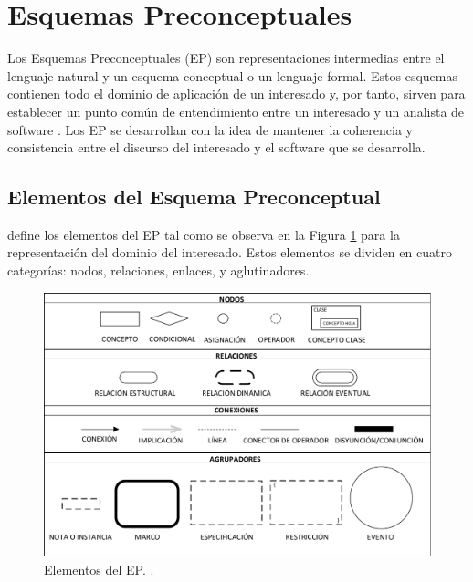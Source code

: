 

\section{Esquemas Preconceptuales}

Los Esquemas Preconceptuales (EP) son representaciones intermedias entre el lenguaje natural y un esquema conceptual o un lenguaje formal. Estos esquemas contienen todo el dominio de aplicación de un interesado y, por tanto, sirven para establecer un punto común de entendimiento entre un interesado y un analista de software \citep{zapata2007phd}. Los EP se desarrollan con la idea de mantener la coherencia y consistencia entre el discurso del interesado y el software que se desarrolla. 

\subsection{Elementos del Esquema Preconceptual}
\cite{zapata2012unc} define los elementos del EP tal como se observa en la Figura \ref{fig:InitialPS} para la representación del dominio del interesado. Estos elementos se dividen en cuatro categorías: nodos, relaciones, enlaces, y aglutinadores.\\

\begin{figure}[h]
	\centering%
	\includegraphics[scale=0.51]{Fig/ElementosDelEP.pdf}%
	\caption[Elementos del EP.]{Elementos del EP. \citep{zapata2012unc}.} \label{fig:InitialPS}
\end{figure}

